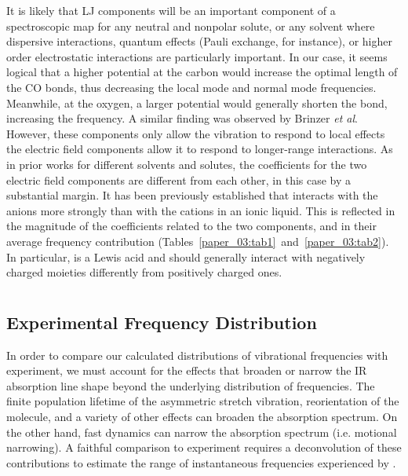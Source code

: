 \documentclass[%
  class = book,%
  crop = false,%
  float = true,%
  multi = true,%
  preview = false,%
]{standalone}
\begin{document}
It is likely that LJ components will be an important component of a spectroscopic map for any neutral and nonpolar solute, or any solvent where dispersive interactions, quantum effects (Pauli exchange, for instance), or higher order electrostatic interactions are particularly important. In our case, it seems logical that a higher potential at the carbon would increase the optimal length of the CO bonds, thus decreasing the local mode and normal mode frequencies. Meanwhile, at the oxygen, a larger potential would generally shorten the bond, increasing the frequency. A similar finding was observed by Brinzer \emph{et al}.\cite{Brinzer2015} However, these components only allow the  vibration to respond to local effects \textemdash{} the electric field components allow it to respond to longer-range interactions. As in prior works for different solvents and solutes, the coefficients for the two electric field components are different from each other, in this case by a substantial margin. It has been previously established that  interacts with the anions more strongly than with the cations in an ionic liquid.\cite{Cadena2004,akiJPCB-04,anthonyJPCB-05,Muldoon2007a,houIECR-07,ramdinIECR-12} This is reflected in the magnitude of the coefficients related to the two components, and in their average frequency contribution (Tables~\ref{paper_03:tab1}~and~\ref{paper_03:tab2}). In particular,  is a Lewis acid and should generally interact with negatively charged moieties differently from positively charged ones.

\section{\texorpdfstring{}{Validation}}
\label{paper_03:sec:V}

\subsection{Experimental Frequency Distribution}
\label{paper_03:ssec:V-A}

In order to compare our calculated distributions of  vibrational frequencies with experiment, we must account for the effects that broaden or narrow the IR absorption line shape beyond the underlying distribution of frequencies. The finite population lifetime of the asymmetric stretch vibration, reorientation of the  molecule, and a variety of other effects can broaden the absorption spectrum. On the other hand, fast dynamics can narrow the absorption spectrum (i.e. motional narrowing). A faithful comparison to experiment requires a deconvolution of these contributions to estimate the range of instantaneous frequencies experienced by .
\end{document}
